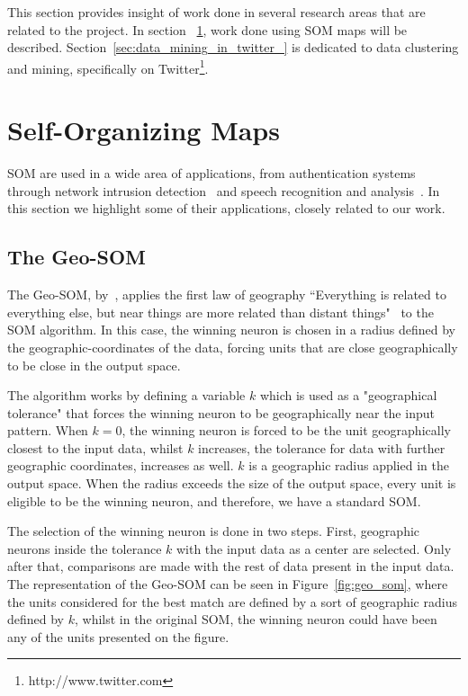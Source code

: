 \label{ch:state_of_the_art}
This section provides insight of work done in several research areas that are related to the project. In section ~\ref{sec:self_organizing_maps}, work done using \ac{SOM} maps will be described. Section~\ref{sec:data_mining_in_twitter_} is dedicated to data clustering and mining, specifically on Twitter\footnote{http://www.twitter.com}.

\section{Self-Organizing Maps} 
\label{sec:self_organizing_maps}
\ac{SOM} are used in a wide area of applications, from authentication systems~\cite{Dozono2012} through network intrusion detection~\cite{intrusion_som} and speech recognition and analysis~\cite{phonetic_typewiter}. In this section we highlight some of their applications, closely related to our work.

\subsection{The Geo-SOM} 
\label{sub:types_of_soms}
The Geo-SOM, by~\citet{Bacao2005}, applies the first law of geography “Everything is related to everything else, but near things are more related than distant things"~\cite{citeulike:612692} to the \ac{SOM} algorithm. In this case, the winning neuron is chosen in a radius defined by the geographic-coordinates of the data, forcing units that are close geographically to be close in the output space.

The algorithm works by defining a variable $k$ which is used as a "geographical tolerance" that forces the winning neuron to be geographically near the input pattern. When $k=0$, the winning neuron is forced to be the unit geographically closest to the input data, whilst $k$ increases, the tolerance for data with further geographic coordinates, increases as well. $k$ is a geographic radius applied in the output space. When the radius exceeds the size of the output space, every unit is eligible to be the winning neuron, and therefore, we have a standard \ac{SOM}.

The selection of the winning neuron is done in two steps. First, geographic neurons inside the tolerance $k$ with the input data as a center are selected. Only after that, comparisons are made with the rest of data present in the input data. The representation of the Geo-SOM can be seen in Figure~\ref{fig:geo_som}, where the units considered for the best match are defined by a sort of geographic radius defined by $k$, whilst in the original \ac{SOM}, the winning neuron could have been any of the units presented on the figure.

